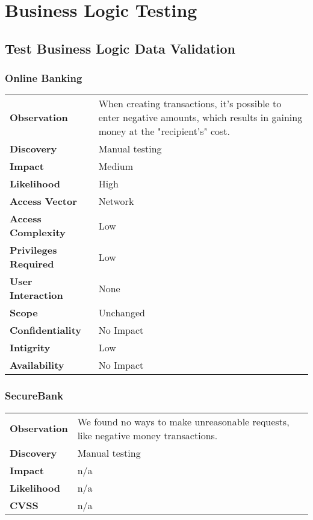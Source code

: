 \section{Business Logic Testing}


\subsection{Test Business Logic Data Validation}
\subsubsection*{Online Banking}
\begin{tabular}{l|p{10cm}}

\textbf{Observation} & When creating transactions, it's possible to enter negative amounts, which results in gaining money at the "recipient's" cost. \\
\textbf{Discovery} & Manual testing \\
\textbf{Impact} & Medium \\
\textbf{Likelihood} & High \\
\textbf{Access Vector} & Network \\
\textbf{Access Complexity} & Low \\
\textbf{Privileges Required} & Low \\
\textbf{User Interaction} & None \\
\textbf{Scope} & Unchanged \\
\textbf{Confidentiality} & No Impact \\
\textbf{Intigrity} & Low \\
\textbf{Availability} & No Impact \\
\end{tabular}

\subsubsection*{SecureBank}
\begin{tabular}{l|p{10cm}}

\textbf{Observation} & We found no ways to make unreasonable requests, like negative money transactions. \\
\textbf{Discovery} & Manual testing \\
\textbf{Impact} & n/a \\
\textbf{Likelihood} & n/a \\
\textbf{CVSS} & n/a \\
\end{tabular}

